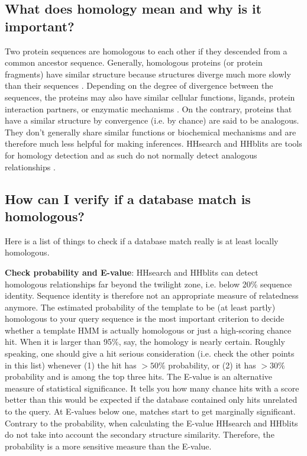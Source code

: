 \documentclass[11pt,a4paper]{article}
\begin{document}
\subsection{What does homology mean and why is it important?}
Two protein sequences are homologous to each other if they descended from a common ancestor sequence. Generally, homologous proteins (or protein fragments) have similar structure because structures diverge much more slowly than their sequences \cite{Chothia:1986}. Depending on the degree of divergence between the sequences, the proteins may also have similar cellular functions, ligands, protein interaction partners, or enzymatic mechanisms \cite{Todd:2001}. On the contrary, proteins that have a similar structure by convergence (i.e. by chance) are said to be analogous. They don't generally share similar functions or biochemical mechanisms and are therefore much less helpful for making inferences. HHsearch and HHblits are tools for homology detection and as such do not normally detect analogous relationships \cite{Alva:2010,Remmert:2010}.


\subsection{How can I verify if a database match is homologous?}
Here is a list of things to check if a database match really is at least locally homologous.
 
{\bf Check probability and E-value}:
HHsearch and HHblits can detect homologous relationships far beyond the twilight zone, i.e. below 20\% sequence identity. Sequence identity is therefore not an appropriate measure of relatedness anymore. The estimated probability of the template to be (at least partly) homologous to your query sequence is the most important criterion to decide whether a template HMM is actually homologous or just a high-scoring chance hit. When it is larger than 95\%, say, the homology is nearly certain. Roughly speaking, one should give a hit serious consideration (i.e. check the other points in this list) whenever (1) the hit has $>50\%$ probability, or (2) it has $>30\%$ probability and is among the top three hits. The E-value is an alternative measure of statistical significance. It tells you how many chance hits with a score better than this would be expected if the database contained only hits unrelated to the query. At E-values below one, matches start to get marginally significant. Contrary to the probability, when calculating the E-value HHsearch and HHblits do not take into account the secondary structure similarity. Therefore, the probability is a more sensitive measure than the E-value.
\end{document}
